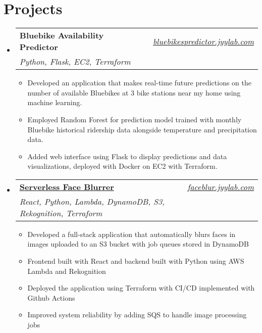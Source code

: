 \documentclass[letterpaper,11pt]{article}
\makeatletter
\newcommand{\resumeItem}[1]{
  \item\small{
    {#1 \vspace{-2pt}}
  }
}
\newcommand{\resumeSubheading}[4]{
  \vspace{-2pt}\item
    \begin{tabular*}{0.97\textwidth}[t]{l@{\extracolsep{\fill}}r}
      \textbf{#1} & #2 \\
      \textit{\small#3} & \textit{\small #4} \\
    \end{tabular*}\vspace{-7pt}
}
\newcommand{\resumeSubHeadingListStart}{\begin{itemize}[leftmargin=0.08in, label={}]}
\newcommand{\resumeSubHeadingListEnd}{\end{itemize}}
\newcommand{\resumeItemListStart}{\begin{itemize}[leftmargin=0.22in]}
\newcommand{\resumeItemListEnd}{\end{itemize}\vspace{-5pt}}
\makeatother
\begin{document}
\section{Projects}
    \resumeSubHeadingListStart
        \resumeSubheading
        {\textbf{{Bluebike Availability Predictor}}}{\emph{\href{https://bluebikespredictor.jyylab.com}{bluebikespredictor.jyylab.com}}}
        {Python, Flask, EC2, Terraform}{}
        \resumeItemListStart
          \resumeItem{Developed an application that makes real-time future predictions on the number of available Bluebikes at 3 bike stations near my home using machine learning.}
          \resumeItem{Employed Random Forest for prediction model trained with monthly Bluebike historical ridership data alongside temperature and precipitation data.}
          \resumeItem{Added web interface using Flask to display predictions and data visualizations, deployed with Docker on EC2 with Terraform.}
        \resumeItemListEnd

        \resumeSubheading
            {\textbf{\href{https://faceblur.jyylab.com}{Serverless Face Blurrer}}}{\emph{\href{https://faceblur.jyylab.com}{faceblur.jyylab.com}}}
            {React, Python, Lambda, DynamoDB, S3, Rekognition, Terraform}{}
            \resumeItemListStart
                \resumeItem{Developed a full-stack application that automatically blurs faces in images uploaded to an S3 bucket with job queues stored in DynamoDB}
                \resumeItem{Frontend built with React and backend built with Python using AWS Lambda and Rekognition}
                \resumeItem{Deployed the application using Terraform with CI/CD implemented with Github Actions}
                \resumeItem{Improved system reliability by adding SQS to handle image processing jobs}
            \resumeItemListEnd

    \resumeSubHeadingListEnd
\end{document}
